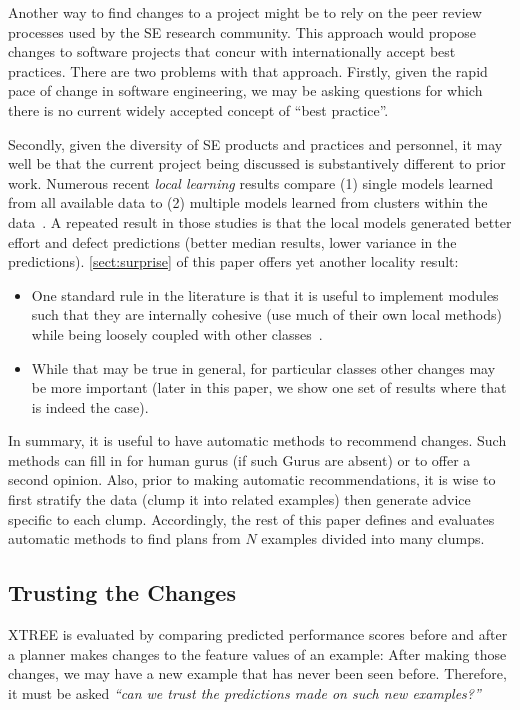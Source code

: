 \documentclass{sig-alternate}
\newcommand{\bi}{\begin{itemize}}
\newcommand{\ei}{\end{itemize}}
\newcommand{\tion}[1]{\textsection\ref{sect:#1}}
\begin{document}
 
Another way  to find   changes to a project
might be to rely
on the peer review processes used by the 
SE research community. This approach would propose changes to software
projects that concur with internationally accept best practices. 
There are two
problems with that approach. Firstly, given the rapid pace of change in software
engineering, we may be asking questions for which there is no current widely
accepted concept of
``best practice''. 

Secondly, given the diversity of SE products and practices
and personnel, it may well be that the current project being discussed is 
substantively different to prior work. 
Numerous recent {\em local learning} results compare (1) single models
learned from all available data to (2) multiple models learned from clusters within the data~\cite{betten14,yang11,yang13,minku13,me12d,me11m,posnett11}.
A repeated result in those studies is that the local models generated better effort
and defect predictions (better median results,
lower variance in the predictions). \tion{surprise} of this  paper offers yet another locality result:
\bi
\item
One standard rule in the literature
is that it is useful to implement modules such that they are internally cohesive (use
much of their own local methods) while being loosely coupled with other classes~\cite{Dhama199565}.
\item
While that may be true in general, for particular classes other changes may be more important
(later in this paper, we show one set of results where that is indeed the case).
\ei
In summary, 
it is useful to have automatic methods to recommend changes. Such
methods can fill in for human gurus (if such Gurus are absent) or 
to offer a second opinion.
Also, prior to making automatic recommendations, it is wise to first stratify the data
(clump it into related examples) then generate advice specific to each clump.
Accordingly, the rest of this paper defines and evaluates
automatic methods to find plans from
  $N$ examples divided  into  many clumps.





\subsection{Trusting the Changes}\label{sect:trust}
   XTREE is evaluated by  comparing
predicted performance scores before and after a planner makes changes to the feature values of an example:
After making those
changes, we may have a new example that has never been seen before. Therefore, it must be asked
{\em ``can we trust the predictions made on such new examples?''}
 
\end{document}
